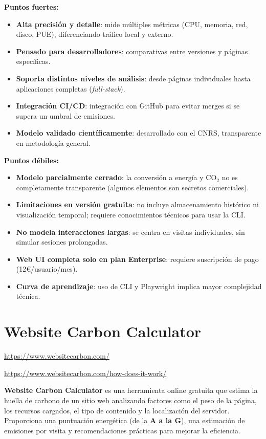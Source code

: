 \documentclass[12pt,a4paper]{report}
\begin{document}
\textbf{Puntos fuertes:}
\begin{itemize}
  \item \textbf{Alta precisión y detalle}: mide múltiples métricas (CPU, memoria, red, disco, PUE), diferenciando tráfico local y externo.
  \item \textbf{Pensado para desarrolladores}: comparativas entre versiones y páginas específicas.
  \item \textbf{Soporta distintos niveles de análisis}: desde páginas individuales hasta aplicaciones completas (\textit{full-stack}).
  \item \textbf{Integración CI/CD}: integración con GitHub para evitar merges si se supera un umbral de emisiones.
  \item \textbf{Modelo validado científicamente}: desarrollado con el CNRS, transparente en metodología general.
\end{itemize}

\textbf{Puntos débiles:}
\begin{itemize}
  \item \textbf{Modelo parcialmente cerrado}: la conversión a energía y CO$_2$ no es completamente transparente (algunos elementos son secretos comerciales).
  \item \textbf{Limitaciones en versión gratuita}: no incluye almacenamiento histórico ni visualización temporal; requiere conocimientos técnicos para usar la CLI.
  \item \textbf{No modela interacciones largas}: se centra en visitas individuales, sin simular sesiones prolongadas.
  \item \textbf{Web UI completa solo en plan Enterprise}: requiere suscripción de pago
        (12€/usuario/mes).
  \item \textbf{Curva de aprendizaje}: uso de CLI y Playwright implica mayor complejidad técnica.
\end{itemize}

\section*{\textbf{Website Carbon Calculator}}

\url{https://www.websitecarbon.com/}

\url{https://www.websitecarbon.com/how-does-it-work/}

\textbf{Website Carbon Calculator} es una herramienta online gratuita que estima la huella de carbono de un sitio web analizando factores como el peso de la página, los recursos cargados, el tipo de contenido y la localización del servidor. Proporciona una puntuación energética (de la \textbf{A a la G}), una estimación de emisiones por visita y recomendaciones prácticas para mejorar la eficiencia.
\end{document}
